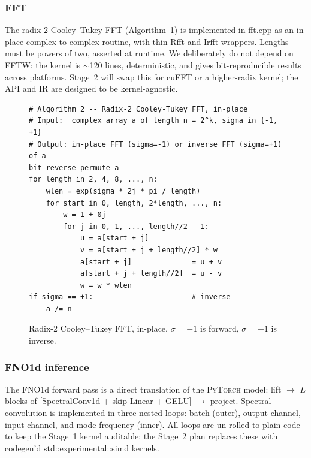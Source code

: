 \documentclass[10pt,twocolumn]{article}
\renewcommand{\texttt}[1]{{\normalfont\ttfamily #1}\normalfont\rmfamily}
\newcommand{\py}{\textsc{PyTorch}}
\begin{document}
\subsubsection{FFT}

The radix-2 Cooley--Tukey FFT (Algorithm~\ref{alg:fft}) is
implemented in \texttt{fft.cpp} as an in-place complex-to-complex
routine, with thin \texttt{Rfft} and \texttt{Irfft} wrappers.
Lengths must be powers of two, asserted at runtime.  We
deliberately do not depend on FFTW: the kernel is $\sim$120
lines, deterministic, and gives bit-reproducible results across
platforms.  Stage~2 will swap this for cuFFT or a higher-radix
kernel; the API and IR are designed to be kernel-agnostic.

\begin{figure}[t]
\centering
\begin{minipage}{0.95\linewidth}
\begin{verbatim}
# Algorithm 2 -- Radix-2 Cooley-Tukey FFT, in-place
# Input:  complex array a of length n = 2^k, sigma in {-1, +1}
# Output: in-place FFT (sigma=-1) or inverse FFT (sigma=+1) of a
bit-reverse-permute a
for length in 2, 4, 8, ..., n:
    wlen = exp(sigma * 2j * pi / length)
    for start in 0, length, 2*length, ..., n:
        w = 1 + 0j
        for j in 0, 1, ..., length//2 - 1:
            u = a[start + j]
            v = a[start + j + length//2] * w
            a[start + j]              = u + v
            a[start + j + length//2]  = u - v
            w = w * wlen
if sigma == +1:                       # inverse
    a /= n
\end{verbatim}
\end{minipage}
\caption{Radix-2 Cooley--Tukey FFT, in-place.  $\sigma = -1$ is
forward, $\sigma = +1$ is inverse.}
\label{alg:fft}
\end{figure}

\subsubsection{FNO1d inference}

The FNO1d forward pass is a direct translation of the \py{} model:
lift $\to$ $L$ blocks of [SpectralConv1d + skip-Linear + GELU]
$\to$ project.  Spectral convolution is implemented in three
nested loops: batch (outer), output channel, input channel, and
mode frequency (inner).  All loops are un-rolled to plain code to
keep the Stage~1 kernel auditable; the Stage~2 plan replaces
these with codegen'd \texttt{std::experimental::simd} kernels.
\end{document}
